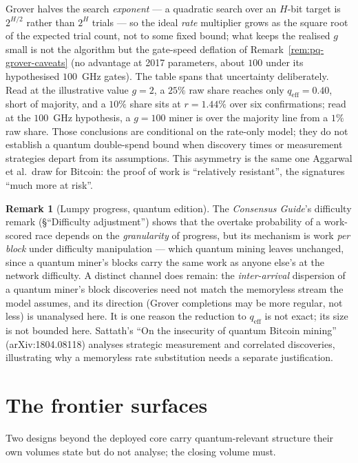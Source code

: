 \documentclass[11pt,a4paper]{article}
\theoremstyle{definition}
\newtheorem{remark}[theorem]{Remark}
\begin{document}
Grover halves the search
\emph{exponent} --- a quadratic search over an $H$-bit target is
$2^{H/2}$ rather than $2^H$ trials --- so the ideal \emph{rate}
multiplier grows as the square root of the expected trial count, not to
some fixed bound; what keeps the realised $g$ small is not the algorithm
but the gate-speed deflation of Remark~\ref{rem:pq-grover-caveats} (no
advantage at 2017 parameters, about $100$ under its hypothesised
$100$~GHz gates). The table spans that uncertainty deliberately. Read
at the illustrative value $g = 2$, a $25\%$ raw
share reaches only $q_{\mathrm{eff}} = 0.40$, short of majority, and a
$10\%$ share sits at $r = 1.44\%$ over six confirmations; read at the
$100$~GHz hypothesis, a $g = 100$ miner is over the majority line from a
$1\%$ raw share. Those conclusions are conditional on the rate-only
model; they do not establish a quantum double-spend bound when discovery
times or measurement strategies depart from its assumptions.
This asymmetry is the same one Aggarwal et
al.\ draw for Bitcoin: the proof of work is ``relatively resistant'',
the signatures ``much more at risk''.

\begin{remark}[Lumpy progress, quantum edition]\label{rem:pq-lumpy}
The \emph{Consensus Guide}'s difficulty remark (\S``Difficulty adjustment'') shows that the overtake probability of a work-scored race
depends on the \emph{granularity} of progress, but its mechanism is
work \emph{per block} under difficulty manipulation --- which quantum
mining leaves unchanged, since a quantum miner's blocks carry the same
work as anyone else's at the network difficulty. A distinct channel
does remain: the \emph{inter-arrival} dispersion of a quantum miner's
block discoveries need not match the memoryless stream the model
assumes, and its direction (Grover completions may be more regular, not
less) is unanalysed here. It is one reason the reduction
to $q_{\mathrm{eff}}$ is not exact; its size is not bounded here. Sattath's
``On the insecurity of quantum Bitcoin mining'' (arXiv:1804.08118)
analyses strategic measurement and correlated discoveries, illustrating why
a memoryless rate substitution needs a separate justification.
\end{remark}

\section{The frontier surfaces}\label{sec:pq-frontier}

Two designs beyond the deployed core carry quantum-relevant structure
their own volumes state but do not analyse; the closing volume must.
\end{document}
